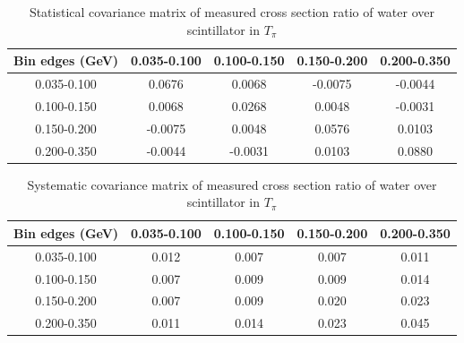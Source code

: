 \documentclass[../main.tex]{subfiles}
\begin{document}
\begin{table}
  \centering
  \renewcommand{\arraystretch}{1.15}
  \caption{Statistical covariance matrix of measured cross section ratio of water over scintillator in $T_{\pi}$}
    \begin{tabular}{c||cccc}
      Bin edges (GeV) & 0.035-0.100 & 0.100-0.150 & 0.150-0.200 & 0.200-0.350\\
      \hline
      \hline
      0.035-0.100 & 0.0676 & 0.0068 & -0.0075 & -0.0044\\
      0.100-0.150 & 0.0068 & 0.0268 & 0.0048 & -0.0031\\
      0.150-0.200 & -0.0075 & 0.0048 & 0.0576 & 0.0103\\
      0.200-0.350 & -0.0044 & -0.0031 & 0.0103 & 0.0880
    \end{tabular}
  \label{tbl:rationucleonnuc10pion_ekinb}
\end{table}
\begin{table}
  \centering
  \renewcommand{\arraystretch}{1.15}
  \caption{Systematic covariance matrix of measured cross section ratio of water over scintillator in $T_{\pi}$}
    \begin{tabular}{c||cccc}
      Bin edges (GeV) & 0.035-0.100 & 0.100-0.150 & 0.150-0.200 & 0.200-0.350\\
      \hline
      \hline
      0.035-0.100 & 0.012 & 0.007 & 0.007 & 0.011\\
      0.100-0.150 & 0.007 & 0.009 & 0.009 & 0.014\\
      0.150-0.200 & 0.007 & 0.009 & 0.020 & 0.023\\
      0.200-0.350 & 0.011 & 0.014 & 0.023 & 0.045
    \end{tabular}
  \label{tbl:rationucleonnuc10pion_ekinc}
\end{table}
\end{document}
